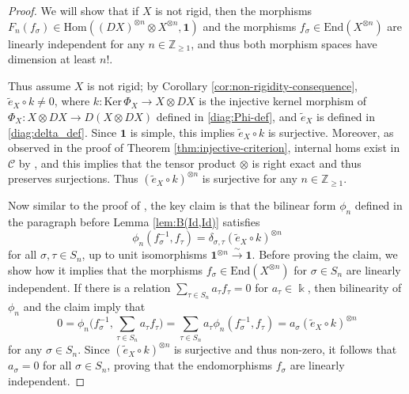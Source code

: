 \documentclass[11pt, reqno]{amsart}
\theoremstyle{definition}\newtheorem{defi}[thm]{Definition}
\theoremstyle{definition}\newtheorem{rem}[thm]{Remark}
\theoremstyle{definition}\newtheorem{exam}[thm]{Example}
\theoremstyle{definition}\newtheorem{assum}[thm]{Assumption}
\newcommand{\cC}{\mathcal{C}}
\newcommand{\til}{\widetilde}
\newcommand{\ZZ}{\mathbb{Z}}
\newcommand{\vac}{\mathbf{1}}
\begin{document}
\begin{proof}
We will show that if $X$ is not rigid, then the morphisms $F_{n}(f_\sigma)\in\mathrm{Hom}((DX)^{\otimes n}\otimes X^{\otimes n},\vac)$ and the morphisms $f_\sigma\in\mathrm{End}(X^{\otimes n})$ are linearly independent for any $n\in\ZZ_{\geq 1}$, and thus both morphism spaces have dimension at least $n!$.

Thus assume $X$ is not rigid; by Corollary \ref{cor:non-rigidity-consequence}, $\til{e}_X\circ k\neq 0$, where $k:\mathrm{Ker}\,\Phi_X\rightarrow X\otimes DX$ is the injective kernel morphism of $\Phi_X: X\otimes DX\rightarrow D(X\otimes DX)$ defined in \eqref{diag:Phi-def}, and $\til{e}_X$ is defined in \eqref{diag:delta_def}. Since $\vac$ is simple, this implies $\til{e}_X\circ k$ is surjective. Moreover, as observed in the proof of Theorem \ref{thm:injective-criterion}, internal homs exist in $\cC$ by \cite[Remark 1.1(iii)]{BD}, and this implies that the tensor product $\otimes$ is right exact and thus preserves surjections. Thus $(\til{e}_X\circ k)^{\otimes n}$ is surjective for any $n\in\ZZ_{\geq 1}$.

Now similar to the proof of \cite[Theorem 1.1]{EP}, the key claim is that the bilinear form $\phi_{n}$ defined in the paragraph before Lemma \ref{lem:B(Id,Id)} satisfies
\begin{equation}\label{eqn:claim}
\phi_{n}(f_\sigma^{-1},f_\tau) =\delta_{\sigma,\tau}(\til{e}_X\circ k)^{\otimes n}
\end{equation}
for all $\sigma,\tau\in S_n$, up to unit isomorphisms $\vac^{\otimes n}\xrightarrow{\sim} \vac$. Before proving the claim, we show how it implies that the morphisms $f_\sigma\in\mathrm{End}(X^{\otimes n})$ for $\sigma\in S_n$ are linearly independent. If there is a relation $\sum_{\tau\in S_n} a_\tau f_\tau=0$ for $a_\tau\in\Bbbk$, then bilinearity of $\phi_{n}$ and the claim imply that
\begin{equation*}
0 =\phi_{n}\bigg(f_\sigma^{-1}, \sum_{\tau\in S_n} a_\tau f_\tau\bigg) =\sum_{\tau\in S_n} a_\tau \phi_{n}(f_\sigma^{-1},f_\tau)=a_\sigma(\til{e}_X\circ k)^{\otimes n}
\end{equation*}
for any $\sigma\in S_n$. Since $(\til{e}_X\circ k)^{\otimes n}$ is surjective and thus non-zero, it follows that $a_\sigma=0$ for all $\sigma\in S_n$, proving that the endomorphisms $f_\sigma$ are linearly independent.


\end{proof}
\end{document}
